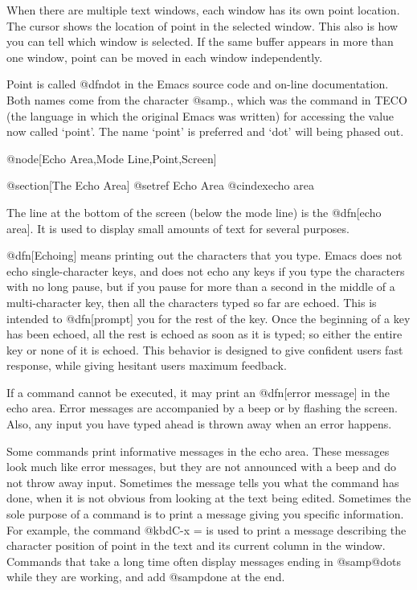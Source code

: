   When there are multiple text windows, each window has its own point location.
The cursor shows the location of point in the selected window.  This also
is how you can tell which window is selected.  If the same buffer appears
in more than one window, point can be moved in each window independently.

  Point is called @dfn{dot} in the Emacs source code and on-line
documentation.  Both names come from the character @samp{.}, which was the
command in TECO (the language in which the original Emacs was written) for
accessing the value now called `point'.  The name `point' is preferred and
`dot' will being phased out.

@node[Echo Area,Mode Line,Point,Screen]

@section[The Echo Area]
@setref Echo Area
@cindex{echo area}

  The line at the bottom of the screen (below the mode line) is the
@dfn[echo area].  It is used to display small amounts of text for several
purposes.

  @dfn[Echoing] means printing out the characters that you type.  Emacs does
not echo single-character keys, and does not echo any keys if you type
the characters with no long pause, but if you pause for more than a second
in the middle of a multi-character key, then all the characters typed so
far are echoed.  This is intended to @dfn[prompt] you for the rest of the
key.  Once the beginning of a key has been echoed, all the rest is echoed
as soon as it is typed; so either the entire key or none of it is
echoed.  This behavior is designed to give confident users fast response,
while giving hesitant users maximum feedback.

  If a command cannot be executed, it may print an @dfn[error message] in
the echo area.  Error messages are accompanied by a beep or by flashing the
screen.  Also, any input you have typed ahead is thrown away when an error
happens.

  Some commands print informative messages in the echo area.  These
messages look much like error messages, but they are not announced with a
beep and do not throw away input.  Sometimes the message tells you what the
command has done, when it is not obvious from looking at the text being
edited.  Sometimes the sole purpose of a command is to print a message
giving you specific information.  For example, the command @kbd{C-x =} is
used to print a message describing the character position of point in the text
and its current column in the window.  Commands that take a long time
often display messages ending in @samp{@dots} while they are working, and
add @samp{done} at the end.

